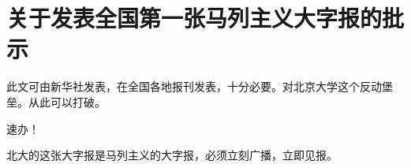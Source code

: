 \section[关于发表全国第一张马列主义大字报的批示（一九六六年六月一日）]{关于发表全国第一张马列主义大字报的批示}


此文可由新华社发表，在全国各地报刊发表，十分必要。对北京大学这个反动堡垒。从此可以打破。

速办！

北大的这张大字报是马列主义的大字报，必须立刻广播，立即见报。



